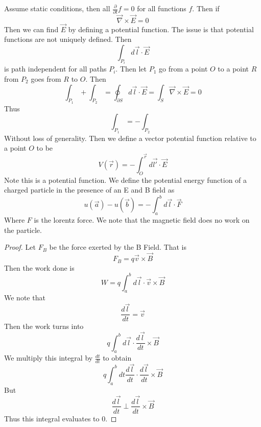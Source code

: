 \documentclass{article}
\newtheorem{one minute paper}[theorem]{One Minute Paper}
\begin{document}
Assume static conditions, then all $\frac{\partial }{\partial t}f = 0$ for all functions $f$. Then if 
\begin{equation}
    \vec{\nabla} \times \vec{E} = 0
\end{equation} 
Then we can find $\vec{E}$ by defining a potential function. The issue is that potential functions are not uniquely defined. Then 
\begin{equation}
    \int_{P_i}d\vec{l} \cdot \vec{E}
\end{equation}
is path independent for all paths $P_i$. Then let $P_1$ go from a point $O$ to a point $R$ from $P_2$ goes from $R$ to $O$. Then 
\begin{equation}
    \int_{P_1} + \int_{P_2} = \oint_{\partial S} d\vec{l} \cdot \vec{E} = \int_S \vec{\nabla} \times \vec{E} = 0
\end{equation} 
Thus 
\begin{equation}
    \int_{P_1} = -\int_{P_2}
\end{equation}
Without loss of generality. Then we define a vector potential function relative to a point $O$ to be 
\begin{equation}
    V(\vec{r}) = -\int_{O}^{\vec{r}}d\vec{l'} \cdot \vec{E}
\end{equation}
Note this is a potential function. We define the potential energy function of a charged particle in the presence of an E and B field as 
\begin{equation}
    u(\vec{a}) - u(\vec{b}) = -\int_{a}^{b}d\vec{l} \cdot \vec{F}
\end{equation}
Where $F$ is the lorentz force. We note that the magnetic field does no work on the particle. 
\begin{proof}
    Let $F_{B}$ be the force exerted by the B Field. That is 
    \begin{equation}
        F_{B} = q\vec{v} \times \vec{B}
    \end{equation}
    Then the work done is 
    \begin{equation}
        W = q\int_{a}^{b}d\vec{l} \cdot \vec{v} \times \vec{B}
    \end{equation}
    We note that 
    \begin{equation}
        \frac{d\vec{l}}{dt} = \vec{v}
    \end{equation}
    Then the work turns into  
    \begin{equation}
        q\int_{a}^{b}d\vec{l} \cdot \frac{d\vec{l}}{dt} \times \vec{B}
    \end{equation}
    We multiply this integral by $\frac{dt}{dt}$ to obtain 
    \begin{equation}
        q\int_{a}^{b}dt\frac{d\vec{l}}{dt} \cdot \frac{d\vec{l}}{dt} \times \vec{B}
    \end{equation}
    But 
    \begin{equation}
        \frac{d\vec{l}}{dt} \perp \frac{d\vec{l}}{dt} \times \vec{B}
    \end{equation}
    Thus this integral evaluates to $0$.
\end{proof} 
\end{document}
